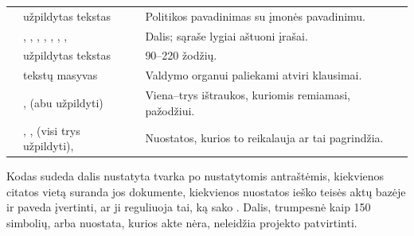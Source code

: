\par\nopagebreak
\begin{xltabular}{\textwidth}{@{}L{36mm}L{38mm}Y@{}}
\toprule
{} &  &  \\
\midrule
\endhead
\bottomrule
\endlastfoot
{} & užpildytas tekstas & Politikos pavadinimas su įmonės pavadinimu. \\
 & , , , , , , ,  & Dalis; sąraše lygiai aštuoni įrašai. \\
 & užpildytas tekstas & 90--220 žodžių. \\
 & tekstų masyvas & Valdymo organui paliekami atviri klausimai. \\
 & ,  (abu užpildyti) & Viena--trys ištraukos, kuriomis remiamasi, pažodžiui. \\
 & , ,  (visi trys užpildyti),  & Nuostatos, kurios to reikalauja ar tai pagrindžia. \\
\end{xltabular}

Kodas sudeda dalis nustatyta tvarka po nustatytomis antraštėmis, kiekvienos citatos vietą
suranda jos dokumente, kiekvienos nuostatos ieško teisės aktų bazėje ir paveda
 įvertinti, ar ji reguliuoja tai, ką sako . Dalis,
trumpesnė kaip 150 simbolių, arba nuostata, kurios akte nėra, neleidžia projekto patvirtinti.

